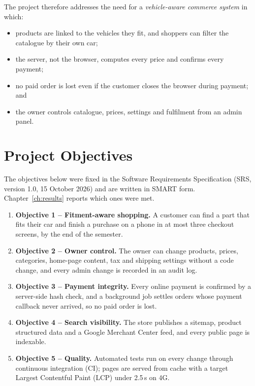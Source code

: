 \documentclass{tietreport}
\begin{document}
The project therefore addresses the need for a \emph{vehicle-aware commerce
system} in which:
\begin{itemize}
  \item products are linked to the vehicles they fit, and shoppers can filter
        the catalogue by their own car;
  \item the server, not the browser, computes every price and confirms every
        payment;
  \item no paid order is lost even if the customer closes the browser during
        payment; and
  \item the owner controls catalogue, prices, settings and fulfilment from an
        admin panel.
\end{itemize}

\section{Project Objectives}

The objectives below were fixed in the Software Requirements Specification
(SRS, version 1.0, 15 October 2026) and are written in SMART form.
Chapter~\ref{ch:results} reports which ones were met.

\begin{enumerate}
  \item \textbf{Objective 1 -- Fitment-aware shopping.} A customer can find a
        part that fits their car and finish a purchase on a phone in at most
        three checkout screens, by the end of the semester.
  \item \textbf{Objective 2 -- Owner control.} The owner can change products,
        prices, categories, home-page content, tax and shipping settings
        without a code change, and every admin change is recorded in an
        audit log.
  \item \textbf{Objective 3 -- Payment integrity.} Every online payment is
        confirmed by a server-side hash check, and a background job settles
        orders whose payment callback never arrived, so no paid order is lost.
  \item \textbf{Objective 4 -- Search visibility.} The store publishes a
        sitemap, product structured data and a Google Merchant Center feed,
        and every public page is indexable.
  \item \textbf{Objective 5 -- Quality.} Automated tests run on every change
        through continuous integration (CI); pages are served from cache with
        a target Largest Contentful Paint (LCP) under 2.5\,s on 4G.
\end{enumerate}
\end{document}
